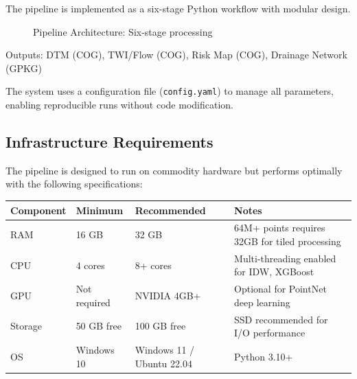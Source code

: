 \documentclass[a4paper,12pt]{article}
\begin{document}
The pipeline is implemented as a six-stage Python workflow with modular design.

\bigskip

\begin{figure}[htbp]
	\centering
	\caption{Pipeline Architecture: Six-stage processing}
\end{figure}

Outputs: DTM (COG), TWI/Flow (COG), Risk Map (COG), Drainage Network (GPKG)

\bigskip

The system uses a configuration file (\texttt{config.yaml}) to manage all parameters, enabling reproducible runs without code modification.

\subsection{Infrastructure Requirements}

The pipeline is designed to run on commodity hardware but performs optimally with the following specifications:

\begin{table}[H]
	\centering
	\begin{tabularx}{\linewidth}{|L|L|L|L|}
		\toprule
		\textbf{Component} & \textbf{Minimum} & \textbf{Recommended}      & \textbf{Notes}                                 \\
		\midrule
		RAM                & 16 GB            & 32 GB                     & 64M+ points requires 32GB for tiled processing \\
		CPU                & 4 cores          & 8+ cores                  & Multi-threading enabled for IDW, XGBoost       \\
		GPU                & Not required     & NVIDIA 4GB+               & Optional for PointNet deep learning            \\
		Storage            & 50 GB free       & 100 GB free               & SSD recommended for I/O performance            \\
		OS                 & Windows 10       & Windows 11 / Ubuntu 22.04 & Python 3.10+                                   \\
		\bottomrule
	\end{tabularx}
\end{table}
\end{document}
